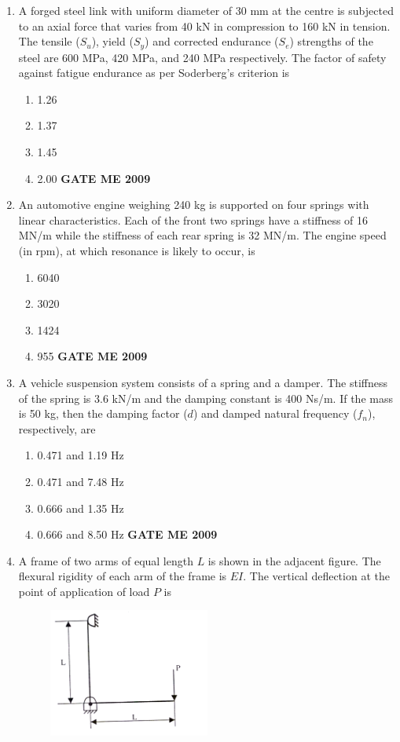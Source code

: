 \documentclass[journal]{IEEEtran}
\begin{document}
\begin{enumerate}[leftmargin=0pt]
\item A forged steel link with uniform diameter of 30 mm at the centre is subjected to an axial force that varies from 40 kN in compression to 160 kN in tension. The tensile ($S_u$), yield ($S_y$) and corrected endurance ($S_e$) strengths of the steel are 600 MPa, 420 MPa, and 240 MPa respectively. The factor of safety against fatigue endurance as per Soderberg's criterion is
\begin{enumerate}[label=(\Alph*)]
  \item 1.26
  \item 1.37
  \item 1.45
  \item 2.00
\hfill{\textbf{GATE ME 2009}}
\end{enumerate}

\item An automotive engine weighing 240 kg is supported on four springs with linear characteristics. Each of the front two springs have a stiffness of 16 MN/m while the stiffness of each rear spring is 32 MN/m. The engine speed (in rpm), at which resonance is likely to occur, is
\begin{enumerate}[label=(\Alph*)]
  \item 6040
  \item 3020
  \item 1424
  \item 955
\hfill{\textbf{GATE ME 2009}}
\end{enumerate}

\item A vehicle suspension system consists of a spring and a damper. The stiffness of the spring is 3.6 kN/m and the damping constant is 400 Ns/m. If the mass is 50 kg, then the damping factor ($d$) and damped natural frequency ($f_n$), respectively, are
\begin{enumerate}[label=(\Alph*)]
  \item 0.471 and 1.19 Hz
  \item 0.471 and 7.48 Hz
  \item 0.666 and 1.35 Hz
  \item 0.666 and 8.50 Hz
\hfill{\textbf{GATE ME 2009}}
\end{enumerate}

\item A frame of two arms of equal length $L$ is shown in the adjacent figure. The flexural rigidity of each arm of the frame is $EI$. The vertical deflection at the point of application of load $P$ is
\begin{figure}[h]
  \centering
  \includegraphics[width=0.5\textwidth]{Figs/image (9).png}
\end{figure}


\end{enumerate}
\end{document}
